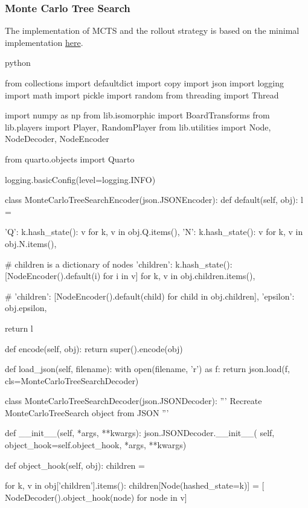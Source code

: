 \subsubsection{Monte Carlo Tree Search}

The implementation of MCTS and the rollout strategy is based on the minimal implementation \href{https://gist.github.com/qpwo/c538c6f73727e254fdc7fab81024f6e1}{here}.

\begin{mintedbox}{python}


from collections import defaultdict
import copy
import json
import logging
import math
import pickle
import random
from threading import Thread

import numpy as np
from lib.isomorphic import BoardTransforms
from lib.players import Player, RandomPlayer
from lib.utilities import Node, NodeDecoder, NodeEncoder

from quarto.objects import Quarto

logging.basicConfig(level=logging.INFO)


class MonteCarloTreeSearchEncoder(json.JSONEncoder):
    def default(self, obj):
        l = {
            'Q': {k.hash_state(): v for k, v in obj.Q.items()},
            'N': {k.hash_state(): v for k, v in obj.N.items()},

            # children is a dictionary of nodes
            'children': {k.hash_state(): [NodeEncoder().default(i) for i in v] for k, v in obj.children.items()},

            # 'children': [NodeEncoder().default(child) for child in obj.children],
            'epsilon': obj.epsilon,
        }
        return l

    def encode(self, obj):
        return super().encode(obj)

    def load_json(self, filename):
        with open(filename, 'r') as f:
            return json.load(f, cls=MonteCarloTreeSearchDecoder)


class MonteCarloTreeSearchDecoder(json.JSONDecoder):
    '''
    Recreate MonteCarloTreeSearch object from JSON
    '''

    def __init__(self, *args, **kwargs):
        json.JSONDecoder.__init__(
            self, object_hook=self.object_hook, *args, **kwargs)

    def object_hook(self, obj):
        children = {}

        for k, v in obj['children'].items():
            children[Node(hashed_state=k)] = [
                NodeDecoder().object_hook(node) for node in v]


\end{mintedbox}

